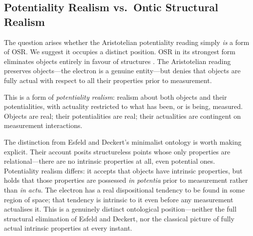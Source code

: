 \subsection{Potentiality Realism vs.\ Ontic Structural Realism}

The question arises whether the Aristotelian potentiality reading simply \textit{is} a form of OSR. We suggest it occupies a distinct position. OSR in its strongest form eliminates objects entirely in favour of structures \citep{french_1988_indiscernibles}. The Aristotelian reading preserves objects---the electron is a genuine entity---but denies that objects are fully actual with respect to all their properties prior to measurement.

\medskip

This is a form of \textit{potentiality realism}: realism about both objects and their potentialities, with actuality restricted to what has been, or is being, measured. Objects are real; their potentialities are real; their actualities are contingent on measurement interactions.

\medskip


\medskip

The distinction from Esfeld and Deckert's minimalist ontology
\cite{esfeld_2017_minimalist} is worth making explicit. Their
account posits structureless points whose only properties are
relational---there are no intrinsic properties at all, even
potential ones. Potentiality realism differs: it accepts that
objects have intrinsic properties, but holds that those properties
are possessed \textit{in potentia} prior to measurement rather than
\textit{in actu}. The electron has a real dispositional tendency
to be found in some region of space; that tendency is intrinsic
to it even before any measurement actualises it. This is a
genuinely distinct ontological position---neither the full
structural elimination of Esfeld and Deckert, nor the classical
picture of fully actual intrinsic properties at every instant.

